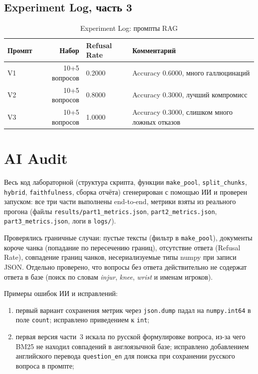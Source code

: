 \documentclass[14pt,a4paper]{extarticle}
\begin{document}
\subsection*{Experiment Log, часть 3}

\begin{table}[H]
    \centering
    \caption*{\raggedleft Experiment Log: промпты RAG}
    \label{tab:log3}
    \small
    \begin{tabular}{l r l >{\raggedright\arraybackslash}p{}}
        \toprule
        Промпт & Набор & Refusal Rate & Комментарий \\
        \midrule
        V1 & 10+5 вопросов & 0.2000 & Accuracy 0.6000, много галлюцинаций \\
        V2 & 10+5 вопросов & 0.8000 & Accuracy 0.3000, лучший компромисс \\
        V3 & 10+5 вопросов & 1.0000 & Accuracy 0.3000, слишком много ложных отказов \\
        \bottomrule
    \end{tabular}
\end{table}

\section{AI Audit}

Весь код лабораторной (структура скрипта, функции \texttt{make\_pool},
\texttt{split\_chunks}, \texttt{hybrid}, \texttt{faithfulness}, сборка отчёта)
сгенерирован с помощью ИИ и проверен запуском: все три части выполнены
end-to-end, метрики взяты из реального прогона (файлы
\texttt{results/part1\_metrics.json}, \texttt{part2\_metrics.json},
\texttt{part3\_metrics.json}, логи в \texttt{logs/}).

Проверялись граничные случаи: пустые тексты (фильтр в \texttt{make\_pool}),
документы короче чанка (попадание по пересечению границ), отсутствие ответа
(Refusal Rate), совпадение границ чанков, несериализуемые типы numpy при
записи JSON. Отдельно проверено, что вопросы без ответа действительно не
содержат ответа в базе (поиск по словам \textit{injur}, \textit{knee},
\textit{wrist} и именам игроков).

Примеры ошибок ИИ и исправлений:
\begin{enumerate}
    \item первый вариант сохранения метрик через \texttt{json.dump} падал
          на \texttt{numpy.int64} в поле \texttt{count}; исправлено приведением
          к \texttt{int};
    \item первая версия части~3 искала по русской формулировке вопроса,
          из-за чего BM25 не находил совпадений в англоязычной базе;
          исправлено добавлением английского перевода \texttt{question\_en}
          для поиска при сохранении русского вопроса в промпте;
\end{enumerate}
\end{document}

